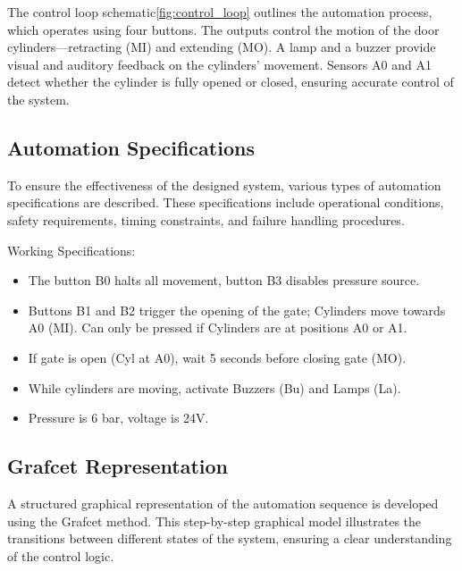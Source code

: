The control loop schematic\ref{fig:control_loop} outlines the automation process, which operates using four buttons. 
The outputs control the motion of the door cylinders—retracting (MI) and extending (MO). 
A lamp and a buzzer provide visual and auditory feedback on the cylinders' movement. Sensors 
A0 and A1 detect whether the cylinder is fully opened or closed, ensuring accurate control of the system.

\subsection{Automation Specifications} \label{sec:Automation_Specifications}

To ensure the effectiveness of the designed system, various types of automation 
specifications are described. These specifications include operational conditions, 
safety requirements, timing constraints, and failure handling procedures.

Working Specifications:
\begin{itemize}
    \item The button B0 halts all movement, button B3 disables pressure source.
    \item Buttons B1 and B2 trigger the opening of the gate; Cylinders move towards A0 (MI). 
    Can only be pressed if Cylinders are at positions A0 or A1.
    \item If gate is open (Cyl at A0),  wait 5 seconds before closing gate (MO).
    \item While cylinders are moving, activate Buzzers (Bu) and Lamps (La).
    \item Pressure is 6 bar, voltage is 24V.
\end{itemize}

\subsection{Grafcet Representation} \label{sec:Grafcet_Representation}

A structured graphical representation of the automation sequence is developed using the 
Grafcet method. This step-by-step graphical model illustrates the transitions between 
different states of the system, ensuring a clear understanding of the control logic.

